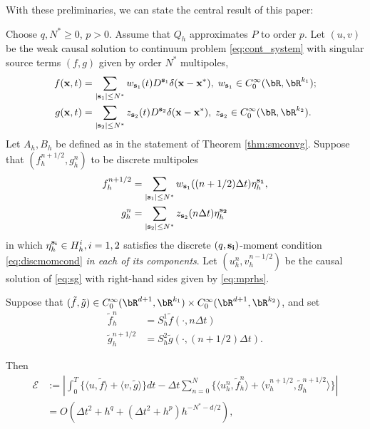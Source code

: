 With these preliminaries, we can state the central result of this paper:

\begin{theorem}\label{thm:conv}
Choose $q, N^*\ge 0$, $p>0$. Assume that $Q_h$ approximates $P$ to
order $p$. Let $(u,v)$ be the weak causal solution to continuum
problem \ref{eq:cont_system} with singular source terms $(f,g)$
given by order $N^*$ multipoles,
\begin{equation*}
\begin{split}
	f(\mathbf x,t) &=  \sum_{|{\bf s}_1| \le N^*}w_{{\bf s}_1}(t) D^{{\bf s}_1}\delta(\mathbf x-\mathbf x^*),  
        \; w_{{\bf s}_1} \in C_0^{\infty}(\bR,\bR^{k_1});\\
	g(\mathbf x,t) &= \sum_{|{\bf s}_2| \le N^*} z_{{\bf s}_2}(t) D^{{\bf s}_2}\delta(\mathbf x-\mathbf x^*),  
	\;z_{{\bf s}_2} \in C_0^{\infty}(\bR,\bR^{k_2}). 
\end{split}
\end{equation*}
Let $A_h,B_h$ be defined as in the statement of Theorem
\ref{thm:smconvg}. Suppose that $(f^{n+1/2}_h,g^n_h)$ to be discrete
multipoles
\begin{equation}
\label{eq:mprhs}
\begin{split}
	f^{n+1/2}_h &=  \sum_{|{\bf s}_1| \le N^*}w_{{\bf
            s}_1}((n+1/2)\Delta t) \eta_h^{\bf s_1},  \\
	g^n_h &= \sum_{|{\bf s}_2| \le N^*} z_{{\bf
            s}_2}(n\Delta t) \eta_h^{\bf s_2}
\end{split}
\end{equation}
in which $\eta_h^{\bf s_i} \in H^i_h, i=1,2$ satisfies the discrete $(q,{\bf s_{\bf i}})$-moment condition
\ref{eq:discmomcond} {\em in each of its components}. Let
$(u^n_h,v^{n-1/2}_h)$ be the causal solution of \ref{eq:sg}
with right-hand sides given by \ref{eq:mprhs}. 

Suppose that $(\tilde f,\tilde g) \in
C^{\infty}_0(\bR^{d+1},\bR^{k_1}) \times
C^{\infty}_0(\bR^{d+1},\bR^{k_2})$, and set
\begin{equation}
\label{eq:defadjrhs}
\begin{split}
\tilde{f}^n_h &= S^1_h\tilde{f}(\cdot,n\Delta t)\\
\tilde{g}^{n+1/2}_h &= S^2_h\tilde{g}(\cdot,(n+1/2)\Delta t).
\end{split}
\end{equation}


Then
\begin{equation}\label{eq:weak_conv}
\begin{split}
	\mathcal E &:= \left| \int_0^T  \Big\{ \langle u,\tilde f\rangle + \langle v,\tilde g\rangle \Big\} dt -
		\Delta t \sum_{n=0}^N \Big\{ \langle u_h^{n}, \tilde f_h^{n} \rangle +
						 	   \langle v_h^{n+1/2}, \tilde g_h^{n+1/2}  \rangle \Big\} \right|\\
	&= O(\Delta t^2 + h^q + (\Delta t^2+h^{p})h^{-N^*-d/2}),
\end{split}
\end{equation}
\end{theorem}

